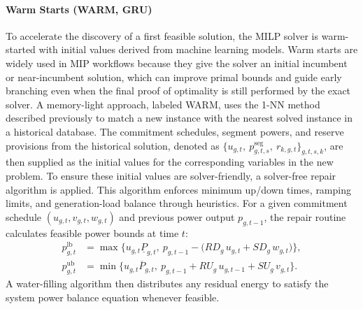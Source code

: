 \documentclass[runningheads]{llncs}
\begin{document}
\paragraph{Warm Starts (WARM, GRU)}
To accelerate the discovery of a first feasible solution, the MILP solver is warm-started with initial values derived from machine learning models. Warm starts are widely used in MIP workflows because they give the solver an initial incumbent or near-incumbent solution, which can improve primal bounds and guide early branching even when the final proof of optimality is still performed by the exact solver. A memory-light approach, labeled WARM, uses the 1-NN method described previously to match a new instance with the nearest solved instance in a historical database. The commitment schedules, segment powers, and reserve provisions from the historical solution, denoted as $\big\{u_{g,t},\ p^{\mathrm{seg}}_{g,t,s},\ r_{k,g,t}\big\}_{g,t,s,k}$, are then supplied as the initial values for the corresponding variables in the new problem. To ensure these initial values are solver-friendly, a solver-free repair algorithm is applied. This algorithm enforces minimum up/down times, ramping limits, and generation-load balance through heuristics. For a given commitment schedule $(u_{g,t},v_{g,t},w_{g,t})$ and previous power output $p_{g,t-1}$, the repair routine calculates feasible power bounds at time $t$:
\begin{align}
p^{\mathrm{lb}}_{g,t}&=\max\!\Big\{u_{g,t}\underline{P}_{g,t},\ p_{g,t-1}-\big(RD_g\,u_{g,t}+SD_g\,w_{g,t}\big)\Big\}, \\
p^{\mathrm{ub}}_{g,t}&=\min\!\Big\{u_{g,t}\overline{P}_{g,t},\ p_{g,t-1}+RU_g\,u_{g,t-1}+SU_g\,v_{g,t}\Big\}.
\end{align}
A water-filling algorithm then distributes any residual energy to satisfy the system power balance equation whenever feasible.
\end{document}
